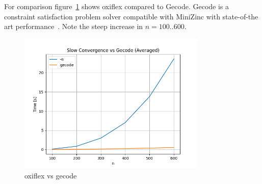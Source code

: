 For comparison figure~\ref{fig:slow:gecode} shows oxiflex compared to Gecode. Gecode is a constraint satisfaction problem solver compatible with MiniZinc with state-of-the art performance~\cite{gecode}. Note the steep increase in $n = 100..600$.

\begin{figure}[ht]
	\centering
	\includegraphics[width=0.8\textwidth]{./Problems/slow_convergence/plots/gecode.png}
	\caption{oxiflex vs gecode}
	\label{fig:slow:gecode}
\end{figure}
